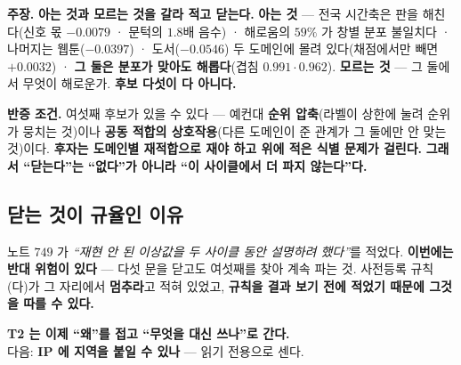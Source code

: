 \documentclass[10pt,a4paper]{article}
\newcommand{\claim}[2]{\begin{claimbox}\textbf{주장.} #1\par\smallskip
  \textcolor{gray!70}{\textbf{반증 조건.} #2}\end{claimbox}}
\begin{document}
\claim{\textbf{아는 것과 모르는 것을 갈라 적고 닫는다.} \textbf{아는 것} --- 전국 시간축은
판을 해친다(신호 몫 $-0.0079$ · 문턱의 $1.8$배 음수) · 해로움의 $59\%$ 가 창별 분포
불일치다 · 나머지는 웹툰($-0.0397$) · 도서($-0.0546$) 두 도메인에 몰려 있다(채점에서만
빼면 $+0.0032$) · \textbf{그 둘은 분포가 맞아도 해롭다}(겹침 $0.991 \cdot 0.962$).
\textbf{모르는 것} --- 그 둘에서 무엇이 해로운가. \textbf{후보 다섯이 다 아니다.}}
{여섯째 후보가 있을 수 있다 --- 예컨대 \textbf{순위 압축}(라벨이 상한에 눌려 순위가
뭉치는 것)이나 \textbf{공동 적합의 상호작용}(다른 도메인이 준 관계가 그 둘에만 안
맞는 것)이다. \textbf{후자는 도메인별 재적합으로 재야 하고 위에 적은 식별 문제가
걸린다.} \textbf{그래서 ``닫는다''는 ``없다''가 아니라 ``이 사이클에서 더 파지
않는다''다.}}

\subsection*{닫는 것이 규율인 이유}

노트 $749$ 가 \emph{``재현 안 된 이상값을 두 사이클 동안 설명하려 했다''}를 적었다.
\textbf{이번에는 반대 위험이 있다} --- 다섯 문을 닫고도 여섯째를 찾아 계속 파는 것.
사전등록 규칙 (다)가 그 자리에서 \textbf{멈추라}고 적혀 있었고, \textbf{규칙을 결과
보기 전에 적었기 때문에 그것을 따를 수 있다.}

\begin{center}
\textbf{T2 는 이제 ``왜''를 접고 ``무엇을 대신 쓰나''로 간다.}\\
다음: \textbf{IP 에 지역을 붙일 수 있나} --- 읽기 전용으로 센다.
\end{center}
\end{document}
